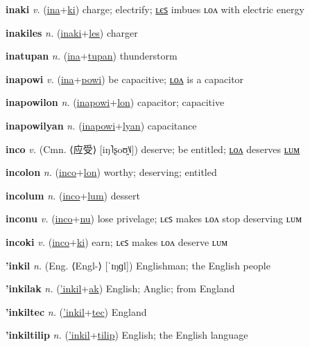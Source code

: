 \textbf{\hypertarget{inaki}{inaki}} \textit{v.} (\hyperlink{ina}{ina}+\allowbreak \hyperlink{ki}{ki})
charge; electrify; \hyperlink{inakiles}{ʟєꜱ} imbues ʟᴏᴧ with electric energy

\textbf{\hypertarget{inakiles}{inakiles}} \textit{n.} (\hyperlink{inaki}{inaki}+\allowbreak \hyperlink{les}{les})
charger

\textbf{\hypertarget{inatupan}{inatupan}} \textit{n.} (\hyperlink{ina}{ina}+\allowbreak \hyperlink{tupan}{tupan})
thunderstorm

\textbf{\hypertarget{inapowi}{inapowi}} \textit{v.} (\hyperlink{ina}{ina}+\allowbreak \hyperlink{powi}{powi})
be capacitive; \hyperlink{inapowilon}{ʟᴏᴧ} is a capacitor

\textbf{\hypertarget{inapowilon}{inapowilon}} \textit{n.} (\hyperlink{inapowi}{inapowi}+\allowbreak \hyperlink{lon}{lon})
capacitor; capacitive

\textbf{\hypertarget{inapowilyan}{inapowilyan}} \textit{n.} (\hyperlink{inapowi}{inapowi}+\allowbreak \hyperlink{lyan}{lyan})
capacitance

\textbf{\hypertarget{inco}{inco}} \textit{v.} (Cmn. ⟨{\chinese{}应受}⟩ [iŋ˥ʂoʊ̯˥˩])
deserve; be entitled; \hyperlink{incolon}{ʟᴏᴧ} deserves \hyperlink{incolum}{ʟᴜᴍ}

\textbf{\hypertarget{incolon}{incolon}} \textit{n.} (\hyperlink{inco}{inco}+\allowbreak \hyperlink{lon}{lon})
worthy; deserving; entitled

\textbf{\hypertarget{incolum}{incolum}} \textit{n.} (\hyperlink{inco}{inco}+\allowbreak \hyperlink{lum}{lum})
dessert

\textbf{\hypertarget{inconu}{inconu}} \textit{v.} (\hyperlink{inco}{inco}+\allowbreak \hyperlink{nu}{nu})
lose privelage; ʟєꜱ makes ʟᴏᴧ stop deserving ʟᴜᴍ

\textbf{\hypertarget{incoki}{incoki}} \textit{v.} (\hyperlink{inco}{inco}+\allowbreak \hyperlink{ki}{ki})
earn; ʟєꜱ makes ʟᴏᴧ deserve ʟᴜᴍ

\textbf{\hypertarget{'inkil}{'inkil}} \textit{n.} (Eng. ⟨Engl-⟩ [ˈɪŋɡl])
Englishman; the English people

\textbf{\hypertarget{'inkilak}{'inkilak}} \textit{n.} (\hyperlink{'inkil}{'inkil}+\allowbreak \hyperlink{ak}{ak})
English; Anglic; from England

\textbf{\hypertarget{'inkiltec}{'inkiltec}} \textit{n.} (\hyperlink{'inkil}{'inkil}+\allowbreak \hyperlink{tec}{tec})
England

\textbf{\hypertarget{'inkiltilip}{'inkiltilip}} \textit{n.} (\hyperlink{'inkil}{'inkil}+\allowbreak \hyperlink{tilip}{tilip})
English; the English language

